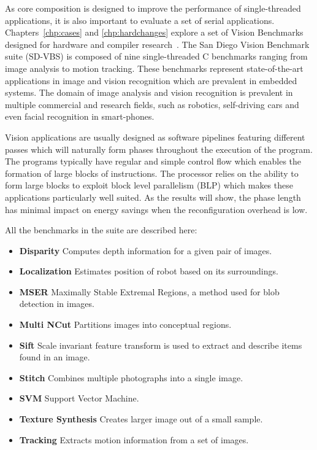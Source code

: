 As core composition is designed to improve the performance of single-threaded applications, it is also important to evaluate a set of serial applications.
Chapters~\ref{chp:cases} and \ref{chp:hardchanges} explore a set of Vision Benchmarks designed for hardware and compiler research~\cite{sdvbs}.
The San Diego Vision Benchmark suite (SD-VBS) is composed of nine single-threaded C benchmarks ranging from image analysis to motion tracking.
These benchmarks represent state-of-the-art applications in image and vision recognition which are prevalent in embedded systems.
The domain of image analysis and vision recognition is prevalent in multiple commercial and research fields, such as robotics, self-driving cars and even facial recognition in smart-phones.

Vision applications are usually designed as software pipelines featuring different passes which will naturally form phases throughout the execution of the program.
The programs typically have regular and simple control flow which enables the formation of large blocks of instructions.
The processor relies on the ability to form large blocks to exploit block level parallelism (BLP) which makes these applications particularly well suited.
As the results will show, the phase length has minimal impact on energy savings when the reconfiguration overhead is low.

All the benchmarks in the suite are described here:
\begin{itemize}
\item \textbf{Disparity} Computes depth information for a given pair of images.
\vspace{-1em}
\item \textbf{Localization} Estimates position of robot based on its surroundings.
\vspace{-1em}
\item \textbf{MSER} Maximally Stable Extremal Regions, a method used for blob detection in images.
\vspace{-1em}
\item \textbf{Multi NCut} Partitions images into conceptual regions.
\vspace{-1em}
\item \textbf{Sift} Scale invariant feature transform is used to extract and describe items found in an image.
\vspace{-1em}
\item \textbf{Stitch} Combines multiple photographs into a single image.
\vspace{-1em}
\item \textbf{SVM} Support Vector Machine.
\vspace{-1em}
\item \textbf{Texture Synthesis} Creates larger image out of a small sample.
\vspace{-1em}
\item \textbf{Tracking} Extracts motion information from a set of images.
\end{itemize}

